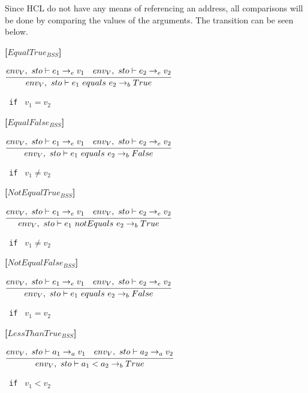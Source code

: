 Since HCL do not have any means of referencing an address, all comparisons will be done by comparing the values of the arguments.
The transition can be seen below.

\textbf{[$EqualTrue_{BSS}$]}\\
\begin{center}
	\begin{math}
	\cfrac
	{env_V,\ sto \vdash e_1 \rightarrow_e v_1 \quad env_V,\ sto \vdash e_2 \rightarrow_e v_2}
	{env_V,\ sto \vdash e_1\ equals\ e_2 \rightarrow_b True}
	\end{math}
	
	\texttt{ if } $v_1 = v_2$
\end{center}

\textbf{[$EqualFalse_{BSS}$]}\\
\begin{center}
	\begin{math}
	\cfrac
	{env_V,\ sto \vdash e_1 \rightarrow_e v_1 \quad env_V,\ sto \vdash e_2 \rightarrow_e v_2}
	{env_V,\ sto \vdash e_1\ equals\ e_2 \rightarrow_b False}
	\end{math}
	
	\texttt{ if } $v_1 \neq v_2$
\end{center}

\textbf{[$NotEqualTrue_{BSS}$]}\\
\begin{center}
	\begin{math}
	\cfrac
	{env_V,\ sto \vdash e_1 \rightarrow_e v_1 \quad env_V,\ sto \vdash e_2 \rightarrow_e v_2}
	{env_V,\ sto \vdash e_1\ notEquals\ e_2 \rightarrow_b True}
	\end{math}
	
	\texttt{ if } $v_1 \neq v_2$
\end{center}

\textbf{[$NotEqualFalse_{BSS}$]}\\
\begin{center}
	\begin{math}
	\cfrac
	{env_V,\ sto \vdash e_1 \rightarrow_e v_1 \quad env_V,\ sto \vdash e_2 \rightarrow_e v_2}
	{env_V,\ sto \vdash e_1\ equals\ e_2 \rightarrow_b False}
	\end{math}
	
	\texttt{ if } $v_1 = v_2$
\end{center}

\textbf{[$LessThanTrue_{BSS}$]}\\
\begin{center}
	\begin{math}
	\cfrac
	{env_V,\ sto \vdash a_1 \rightarrow_a v_1 \quad env_V,\ sto \vdash a_2 \rightarrow_a v_2}
	{env_V,\ sto \vdash a_1 < a_2 \rightarrow_b True}
	\end{math}
	
	\texttt{ if } $v_1 < v_2$
\end{center}

